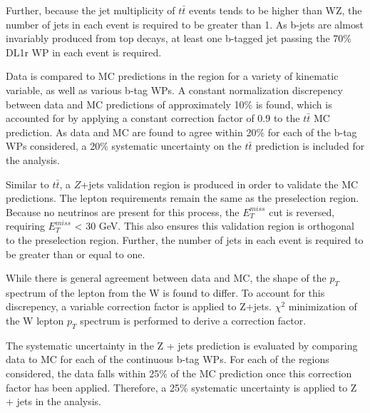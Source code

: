 Further, because the jet multiplicity of $t\bar{t}$ events tends to be higher than WZ, the number of jets in each event is required to be greater than 1. As b-jets are almost invariably produced from top decays, at least one b-tagged jet passing the 70\% DL1r WP in each event is required. 

Data is compared to MC predictions in the region for a variety of kinematic variable, as well as various b-tag WPs. A constant normalization discrepency between data and MC predictions of approximately 10\% is found, which is accounted for by applying a constant correction factor of 0.9 to the $t\bar{t}$ MC prediction. As data and MC are found to agree within 20\% for each of the b-tag WPs considered, a 20\% systematic uncertainty on the $t\bar{t}$ prediction is included for the analysis.

Similar to $t\bar{t}$, a $Z$+jets validation region is produced in order to validate the MC predictions. The lepton requirements remain the same as the preselection region. Because no neutrinos are present for this process, the $E_T^{miss}$ cut is reversed, requiring $E_T^{miss}$ < 30 GeV. This also ensures this validation region is orthogonal to the preselection region. Further, the number of jets in each event is required to be greater than or equal to one.

While there is general agreement between data and MC, the shape of the $p_T$ spectrum of the lepton from the W is found to differ. To account for this discrepency, a variable correction factor is applied to Z+jets. $\chi^2$ minimization of the W lepton $p_T$ spectrum is performed to derive a correction factor.

The systematic uncertainty in the Z + jets prediction is evaluated by comparing data to MC for each of the continuous b-tag WPs. For each of the regions considered, the data falls within 25\% of the MC prediction once this correction factor has been applied. Therefore, a 25\% systematic uncertainty is applied to Z + jets in the analysis.

